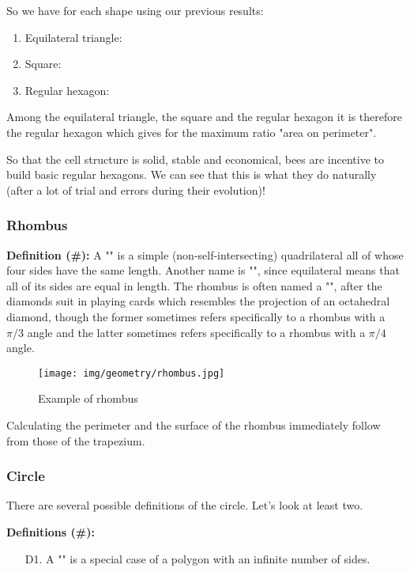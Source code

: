 {	So we have for each shape using our previous results:
	\begin{enumerate}
		\item Equilateral triangle:
			
		\item Square:
			

		\item Regular hexagon:
			
	\end{enumerate}
	Among the equilateral triangle, the square and the regular hexagon it is therefore the regular hexagon which gives for the maximum ratio "area on perimeter".
	
	So that the cell structure is solid, stable and economical, bees are incentive to build basic regular hexagons. We can see that this is what they do naturally (after a lot of trial and errors during their evolution)!
	
	\subsubsection{Rhombus}
	\textbf{Definition (\#\mydef):} A "" is a simple (non-self-intersecting) quadrilateral all of whose four sides have the same length. Another name is "", since equilateral means that all of its sides are equal in length. The rhombus is often named a "", after the diamonds suit in playing cards which resembles the projection of an octahedral diamond, though the former sometimes refers specifically to a rhombus with a $\pi/3$ angle and the latter sometimes refers specifically to a rhombus with a $\pi/4$ angle.
	
	\begin{figure}[H]
		\centering
		\texttt{[image: img/geometry/rhombus.jpg]}
		\caption{Example of rhombus}
	\end{figure}
	Calculating the perimeter and the surface of the rhombus immediately follow from those of the trapezium.
	
	\pagebreak
	\subsubsection{Circle}
	There are several possible definitions of the circle. Let's look at  least two.
	
	\textbf{Definitions (\#\mydef):}
	\begin{enumerate}
		\item[D1.] A "" is a special case of a polygon with an infinite number of sides.
		

\end{enumerate}}
